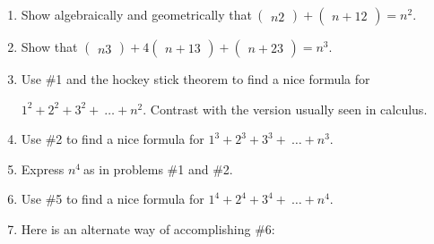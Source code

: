 \documentclass[10pt,letter]{article}
\begin{document}
\begin{enumerate}
\def\labelenumi{\arabic{enumi}.}

\item
  Show algebraically and geometrically that\(\
\begin{pmatrix}
  n
  2
  \end{pmatrix}
 +
\begin{pmatrix}
  n + 1
  2
  \end{pmatrix}
 = n^{2}\).
\item
  Show that \(\begin{pmatrix}
  n
  3
  \end{pmatrix}
 + 4
\begin{pmatrix}
  n + 1
  3
  \end{pmatrix}
 +
\begin{pmatrix}
  n + 2
  3
  \end{pmatrix}
 = n^{3}\).
\item
  Use \#1 and the hockey stick theorem to find a nice formula for

\(1^{2} + 2^{2} + 3^{2} + \ \ldots + n^{2}\). Contrast with the
  version usually seen in calculus.
\item
  Use \#2 to find a nice formula for
  \(1^{3} + 2^{3} + 3^{3} + \ \ldots + n^{3}\).
\item
  Express \(n^{4}\ \)as in problems \#1 and \#2.
\item
  Use \#5 to find a nice formula for
  \(1^{4} + 2^{4} + 3^{4} + \ \ldots + n^{4}\).
\item
  Here is an alternate way of accomplishing \#6:

\end{enumerate}
\end{document}
